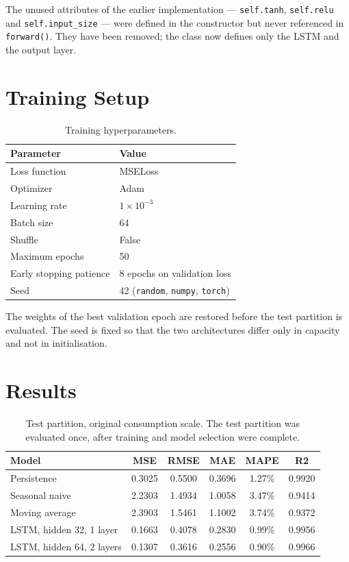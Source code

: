 \documentclass[11pt,a4paper]{article}
\begin{document}
\noindent
The unused attributes of the earlier implementation --- \texttt{self.tanh}, \texttt{self.relu} and
\texttt{self.input\_size} --- were defined in the constructor but never referenced in
\texttt{forward()}. They have been removed; the class now defines only the LSTM and the output
layer.


\section{Training Setup}

\begin{table}[H]
\centering
\begin{tabular}{ll}
\toprule
\textbf{Parameter} & \textbf{Value} \\
\midrule
Loss function & MSELoss \\
Optimizer & Adam \\
Learning rate & $1 \times 10^{-3}$ \\
Batch size & 64 \\
Shuffle & False \\
Maximum epochs & 50 \\
Early stopping patience & 8 epochs on validation loss \\
Seed & 42 (\texttt{random}, \texttt{numpy}, \texttt{torch}) \\
\bottomrule
\end{tabular}
\caption{Training hyperparameters.}
\end{table}

\noindent
The weights of the best validation epoch are restored before the test partition is evaluated. The
seed is fixed so that the two architectures differ only in capacity and not in initialisation.


\section{Results}

\begin{table}[H]
\centering
\begin{tabular}{lccccc}
\toprule
\textbf{Model} & \textbf{MSE} & \textbf{RMSE} & \textbf{MAE} & \textbf{MAPE} & \textbf{R2} \\
\midrule
Persistence                   & 0.3025 & 0.5500 & 0.3696 & 1.27\% & 0.9920 \\
Seasonal naive                & 2.2303 & 1.4934 & 1.0058 & 3.47\% & 0.9414 \\
Moving average                & 2.3903 & 1.5461 & 1.1002 & 3.74\% & 0.9372 \\
\midrule
LSTM, hidden 32, 1 layer      & 0.1663 & 0.4078 & 0.2830 & 0.99\% & 0.9956 \\
LSTM, hidden 64, 2 layers     & 0.1307 & 0.3616 & 0.2556 & 0.90\% & 0.9966 \\
\bottomrule
\end{tabular}
\caption{Test partition, original consumption scale. The test partition was evaluated once, after
training and model selection were complete.}
\end{table}
\end{document}
